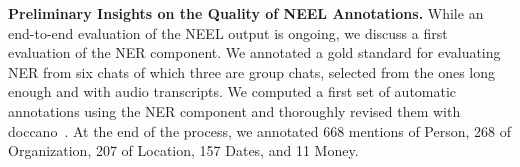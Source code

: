 

\textbf{Preliminary Insights on the Quality of NEEL Annotations.}
While an end-to-end evaluation of the NEEL output is ongoing, we discuss a first evaluation of the NER component. 
We annotated a gold standard for evaluating NER from six chats of which three are group chats, selected from the ones long enough and with audio transcripts. %
We computed a first set of automatic annotations using the NER component and thoroughly revised them with doccano~\cite{doccano}. At the end of the process, we annotated 668 mentions of Person, 268 of Organization, 207 of Location, 157 Dates, and 11 Money.

